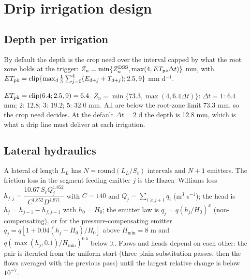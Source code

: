 \chapter{Drip irrigation design}\label{ch:drip}

\section{Depth per irrigation}
By default the depth is the crop need over the interval capped by what the root zone holds at the trigger: $Z_n=\min\{Z_n^{\rm DSS},\max(4,ET_{\rm pk}\Delta t)\}$ mm, with $ET_{\rm pk}=\mathrm{clip}\{\max_d\frac15\sum_{j=0}^{4}(E_{d+j}+T_{d+j});2.5,9\}$ mm d$^{-1}$.

\sol  $ET_{\rm pk}=\mathrm{clip}(6.4;2.5,9)=6.4$. $Z_n=\min\{73.3,\max(4,6.4\Delta t)\}$: $\Delta t=1$: $6.4$ mm; $2$: $12.8$; $3$: $19.2$; $5$: $32.0$ mm. All are below the root-zone limit 73.3 mm, so the crop need decides. At the default $\Delta t=2$ d the depth is 12.8 mm, which is what a drip line must deliver at each irrigation.


\section{Lateral hydraulics}
A lateral of length $L_L$ has $N=\mathrm{round}(L_L/S_e)$ intervals and $N+1$ emitters. The friction loss in the segment feeding emitter $j$ is the Hazen--Williams loss $h_{f,j}=\dfrac{10.67\,S_eQ_j^{1.852}}{C^{1.852}D^{4.871}}$ with $C=140$ and $Q_j=\sum_{i\ge j+1}q_i$ (m$^3$ s$^{-1}$); the head is $h_j=h_{j-1}-h_{f,j-1}$ with $h_0=H_0$; the emitter law is $q_j=q(h_j/H_0)^x$ (non-compensating), or for the pressure-compensating emitter $q_j=q[1+0.04(h_j-H_0)/H_0]$ above $H_{\min}=8$ m and $q(\max(h_j,0.1)/H_{\min})^{0.5}$ below it. Flows and heads depend on each other: the pair is iterated from the uniform start (three plain substitution passes, then the flows averaged with the previous pass) until the largest relative change is below $10^{-7}$.

